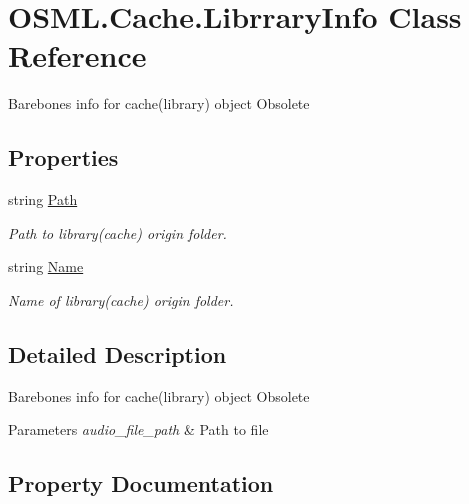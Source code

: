 \hypertarget{classOSML_1_1Cache_1_1LibrraryInfo}{}\section{O\+S\+M\+L.\+Cache.\+Librrary\+Info Class Reference}
\label{classOSML_1_1Cache_1_1LibrraryInfo}


Barebones info for cache(library) object Obsolete  


\subsection*{Properties}
\begin{DoxyCompactItemize}
\item 
string \mbox{\hyperlink{classOSML_1_1Cache_1_1LibrraryInfo_adaf3deef45faeadf1595e9fe078511bc}{Path}}
\begin{DoxyCompactList}\small\item\em Path to library(cache) origin folder. \end{DoxyCompactList}\item 
string \mbox{\hyperlink{classOSML_1_1Cache_1_1LibrraryInfo_a69f458e6eb5cdf0a24ca92dabb0f9549}{Name}}
\begin{DoxyCompactList}\small\item\em Name of library(cache) origin folder. \end{DoxyCompactList}\end{DoxyCompactItemize}


\subsection{Detailed Description}
Barebones info for cache(library) object Obsolete 


\begin{DoxyParams}{Parameters}
{\em audio\+\_\+file\+\_\+path} & Path to file\\
\hline
\end{DoxyParams}


\subsection{Property Documentation}
\mbox{\label{classOSML_1_1Cache_1_1LibrraryInfo_a69f458e6eb5cdf0a24ca92dabb0f9549}} 
